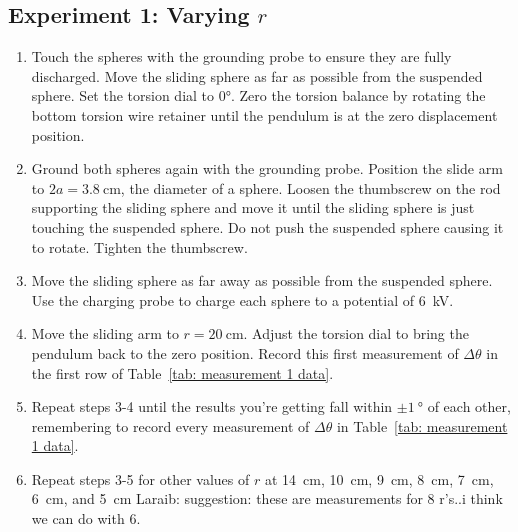 \documentclass[addpoints]{physlabs}
\begin{document}
\begin{labsection}
\begin{experiment}
\subsection*{Experiment 1: Varying $r$}\label{subsec: experiment 1}
\begin{enumerate}
    \item Touch the spheres with the grounding probe to ensure they are fully discharged. Move the sliding sphere as far as possible from the suspended sphere.
    Set the torsion dial to \ang{0}.
    Zero the torsion balance by rotating the bottom torsion wire retainer until the pendulum is at the zero displacement position.
    \item Ground both spheres again with the grounding probe.
    Position the slide arm to $2a=\qty{3.8}{\centi\meter}$, the diameter of a sphere.
    Loosen the thumbscrew on the rod supporting the sliding sphere and move it until the sliding sphere is just touching the suspended sphere.
    Do not push the suspended sphere causing it to rotate.
    Tighten the thumbscrew.
    \item Move the sliding sphere as far away as possible from the suspended sphere.
    Use the charging probe to charge each sphere to a potential of \qty{6}{\kilo\volt}.
    \item Move the sliding arm to $r=\qty{20}{\centi\meter}$.
    Adjust the torsion dial to bring the pendulum back to the zero position.
    Record this first measurement of $\Delta\theta$ in the first row of Table~\ref{tab: measurement 1 data}.
    \item Repeat steps 3-4 until the results you're getting fall within $\pm\qty{1}{\degree}$ of each other, remembering to record every measurement of $\Delta\theta$ in Table~\ref{tab: measurement 1 data}.
    \item Repeat steps 3-5 for other values of $r$ at \qty{14}{\centi\meter}, \qty{10}{\centi\meter}, \qty{9}{\centi\meter}, \qty{8}{\centi\meter}, \qty{7}{\centi\meter}, \qty{6}{\centi\meter}, and \qty{5}{\centi\meter} {\color{red} Laraib: suggestion: these are measurements for 8 r's..i think we can do with 6}.
\end{enumerate}


\end{experiment}
\end{labsection}
\end{document}
